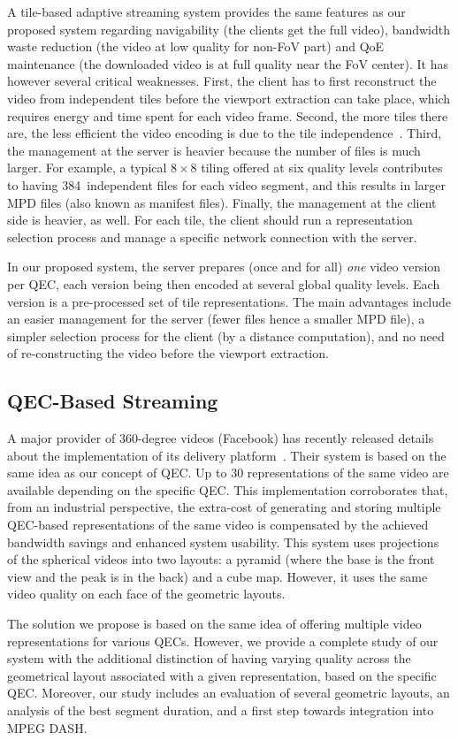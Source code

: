 A tile-based adaptive streaming
system provides the same features as our proposed system regarding navigability (the clients
get the full video), bandwidth
waste reduction (the video at low quality for non-\ac{FoV} part) and \ac{QoE} maintenance (the downloaded video is at full quality near the
\ac{FoV} center). It has however several critical weaknesses. First, the client has to first reconstruct
the video from independent tiles before the viewport extraction can take place, which requires energy and
time spent for each video frame. Second, the more tiles there are, the less efficient the video encoding is due to the
tile independence~\cite{sanchez_compressed_2015}. Third, the management at the server is
heavier because the number of files
is much larger. For example, a typical $8\times8$ tiling offered at six quality levels contributes to having
384~independent files for each video segment, and this results in larger \ac{MPD} files (also known as
manifest files).
Finally, the management at the client side is heavier, as well. For each tile, the client should run
a representation selection process
and manage a specific network connection with the server.

 In our proposed system, the server prepares (once and for
all) \emph{one} video version per
\ac{QEC}, each version being then encoded at several global quality levels. Each version
is a pre-processed set of tile representations. The main advantages include an easier
management for the server
(fewer files hence a smaller \ac{MPD} file), a simpler selection process for the client (by
a distance computation), and no need of re-constructing the video before the viewport extraction.

\subsection{QEC-Based Streaming}

A major  provider of 360-degree videos (Facebook) has recently
released details about the
implementation of its delivery platform~\cite{facebook}. Their system is based
on the same idea as our concept of \ac{QEC}. Up to 30 representations of the same video
are available depending on the specific
\ac{QEC}. This implementation corroborates that, from an industrial perspective, the
extra-cost of
generating and storing multiple \ac{QEC}-based representations of the same video
is compensated by the achieved bandwidth
savings and enhanced system usability. This system uses projections of the spherical videos into two layouts: a pyramid (where the
base is the front
view and the peak is in the back) and a cube map. However, it uses the same video quality
on each face of the geometric layouts.

The
solution we propose is based on the same idea of offering multiple video representations
for various \acp{QEC}.
However, we provide a complete study of
our system with the additional distinction of having varying quality across the geometrical layout associated with a given representation, based on the specific \ac{QEC}.
Moreover, our
study includes an evaluation of several geometric layouts, an analysis of the best segment
duration, and a first step towards integration into MPEG \ac{DASH}.
